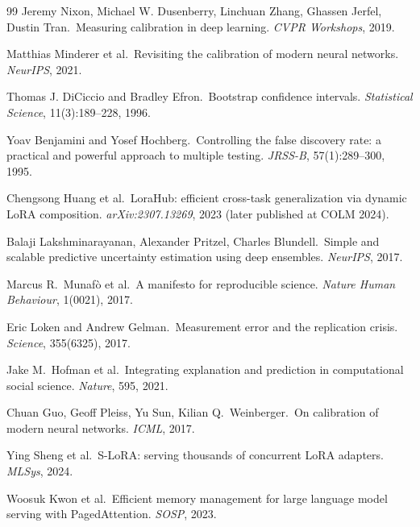 \documentclass[11pt]{article}
\begin{document}
\begin{thebibliography}{99}
Jeremy Nixon, Michael W. Dusenberry, Linchuan Zhang, Ghassen Jerfel, Dustin Tran.\ Measuring calibration in deep learning. \emph{CVPR Workshops}, 2019.

Matthias Minderer et al.\ Revisiting the calibration of modern neural networks. \emph{NeurIPS}, 2021.

Thomas J. DiCiccio and Bradley Efron.\ Bootstrap confidence intervals. \emph{Statistical Science}, 11(3):189--228, 1996.

Yoav Benjamini and Yosef Hochberg.\ Controlling the false discovery rate: a practical and powerful approach to multiple testing. \emph{JRSS-B}, 57(1):289--300, 1995.

Chengsong Huang et al.\ LoraHub: efficient cross-task generalization via dynamic LoRA composition. \emph{arXiv:2307.13269}, 2023 (later published at COLM 2024).

Balaji Lakshminarayanan, Alexander Pritzel, Charles Blundell.\ Simple and scalable predictive uncertainty estimation using deep ensembles. \emph{NeurIPS}, 2017.

Marcus R.\ Munafò et al.\ A manifesto for reproducible science. \emph{Nature Human Behaviour}, 1(0021), 2017.

Eric Loken and Andrew Gelman.\ Measurement error and the replication crisis. \emph{Science}, 355(6325), 2017.

Jake M.\ Hofman et al.\ Integrating explanation and prediction in computational social science. \emph{Nature}, 595, 2021.

Chuan Guo, Geoff Pleiss, Yu Sun, Kilian Q.\ Weinberger.\ On calibration of modern neural networks. \emph{ICML}, 2017.

Ying Sheng et al.\ S-LoRA: serving thousands of concurrent LoRA adapters. \emph{MLSys}, 2024.

Woosuk Kwon et al.\ Efficient memory management for large language model serving with PagedAttention. \emph{SOSP}, 2023.


\end{thebibliography}
\end{document}
